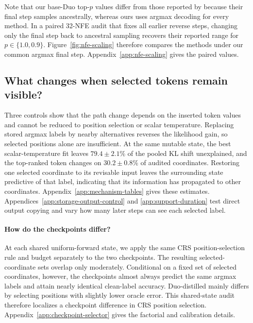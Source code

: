 \documentclass{article}
\newcommand{\1}{\mathbf 1}
\newcommand{\CRS}{\textsc{CRS}}
\theoremstyle{definition}
\begin{document}
Note that our base-Duo top-$p$ values differ from those reported by
\mbox{\citet{deschenaux2026psi}} because their final step samples ancestrally,
whereas ours uses argmax decoding for every method. In a paired 32-NFE audit
that fixes all earlier reverse steps, changing only the final step back to
ancestral sampling recovers their reported range for $p\in\{1.0,0.9\}$.
Figure~\ref{fig:nfe-scaling} therefore compares the methods under our common
argmax final step. Appendix~\ref{app:nfe-scaling} gives the paired values.

\subsection{What changes when selected tokens remain visible?}
\label{sec:mechanism-evidence}

Three controls show that the path change depends on the inserted token values
and cannot be reduced to position selection or scalar temperature. Replacing
stored argmax labels by nearby alternatives reverses the likelihood gain, so
selected positions alone are insufficient. At the same mutable state, the
best scalar-temperature fit leaves
$79.4\pm2.1\%$ of the pooled KL shift unexplained, and the top-ranked token
changes on $30.2\pm0.8\%$ of audited coordinates. Restoring one
selected coordinate to its revisable input leaves the surrounding state
predictive of that label, indicating that its information has propagated to
other coordinates. Appendix~\ref{app:mechanism-tables} gives
these estimates. Appendices~\ref{app:storage-output-control} and
\ref{app:support-duration} test direct output copying and vary how many later
steps can see each selected label.

\paragraph{How do the checkpoints differ?}
At each shared uniform-forward state, we apply the same \CRS{} position-selection rule and budget separately to the two checkpoints. The resulting selected-coordinate sets overlap only moderately. Conditional on a fixed set of selected coordinates, however, the checkpoints almost always predict the same argmax labels and attain nearly identical clean-label accuracy. Duo-distilled mainly differs by selecting positions with slightly lower oracle error. This shared-state audit therefore localizes a checkpoint difference in \CRS{} position selection. Appendix~\ref{app:checkpoint-selector} gives the factorial and calibration details.
\end{document}
